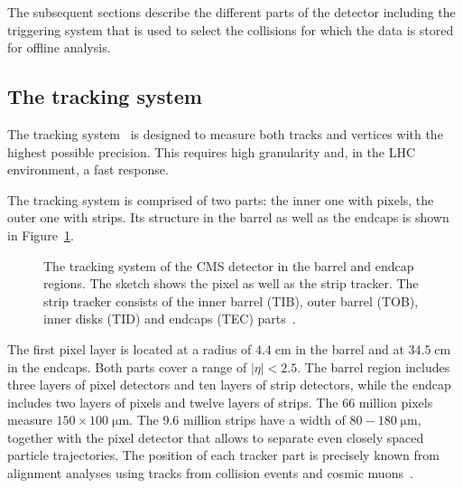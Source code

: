 The subsequent sections describe the different parts of the detector including the triggering system that is used to select the collisions for which the data is stored for offline analysis.


\subsection{The tracking system}
\label{set:det_tracker}

The tracking system~\cite{Bayatian:922757} is designed to measure both tracks and vertices with the highest possible precision.
This requires high granularity and, in the LHC environment, a fast response.

The tracking system is comprised of two parts: the inner one with pixels, the outer one with strips.
Its structure in the barrel as well as the endcaps is shown in Figure~\ref{fig:det_Tracker}.

\begin{figure}[htbp!]
  \begin{center}

\caption{The tracking system of the CMS detector in the barrel and endcap regions. The sketch shows the pixel as well as the strip tracker. The strip tracker consists of the inner barrel (TIB), outer barrel (TOB), inner disks (TID) and endcaps (TEC) parts~\cite{Dominguez:1481838}.
  \label{fig:det_Tracker}}
  \end{center}
\end{figure}



The first pixel layer is located at a radius of $4.4 \;\si{\centi \meter}$ in the barrel and at $34.5 \;\si{\centi \meter}$ in the endcaps.
Both parts cover a range of $|\eta| < 2.5$.
The barrel region includes three layers of pixel detectors and ten layers of strip detectors, while the endcap includes two layers of pixels and twelve layers of strips.
The 66 million pixels measure $150 \times 100 \; \si{\micro \meter}$. The 9.6 million strips have a width of $80-180  \;\si{\micro \meter}$, together with the pixel detector that allows to separate even closely spaced
particle trajectories.
The position of each tracker part is precisely known from alignment analyses using tracks from collision events and cosmic muons~\cite{Chatrchyan:2014wfa}.

